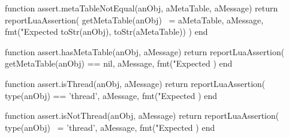 \stopTestSuite


\startLuaCode
function assert.metaTableNotEqual(anObj, aMetaTable, aMessage)
  return reportLuaAssertion(
    getMetaTable(anObj) ~= aMetaTable,
    aMessage,
    fmt("Expected %
      toStr(anObj), toStr(aMetaTable))
  )
end
\stopLuaCode

\stopTestSuite


\startLuaCode
function assert.hasMetaTable(anObj, aMessage)
  return reportLuaAssertion(
    getMetaTable(anObj) == nil,
    aMessage,
    fmt("Expected %
  )
end
\stopLuaCode

\stopTestSuite


\startLuaCode
function assert.isThread(anObj, aMessage)
  return reportLuaAssertion(
    type(anObj) == 'thread',
    aMessage,
    fmt("Expected %
  )
end
\stopLuaCode

\stopTestSuite


\startLuaCode
function assert.isNotThread(anObj, aMessage)
  return reportLuaAssertion(
    type(anObj) ~= 'thread',
    aMessage,
    fmt("Expected %
  )
end
\stopLuaCode

\stopTestSuite

\stopchapter